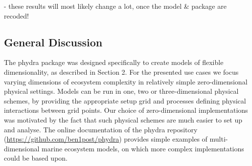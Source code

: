 \documentclass[template.tex]{subfiles}
\begin{document}
- these results will most likely change a lot, once the model & package are recoded!\\


\subsection{General Discussion}

The phydra package was designed specifically to create models of flexible dimensionality, as described in Section 2. For the presented use cases we focus varying dimensions of ecosystem complexity in relatively simple zero-dimensional physical settings. Models can be run in one, two or three-dimensional physical schemes, by providing the appropriate setup grid and processes defining physical interactions between grid points. Our choice of zero-dimensional implementations was motivated by the fact that such physical schemes are much easier to set up and analyse. The online documentation of the phydra repository (\url{https://github.com/ben1post/phydra}) provides simple examples of multi-dimensional marine ecosystem models, on which more complex implementations could be based upon.\\


\clearpage

\biblio
\end{document}
